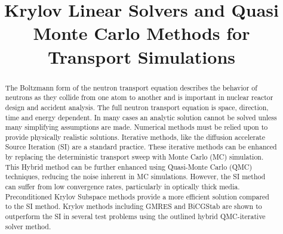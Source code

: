 \documentclass{nseJournal}
\begin{document}
\title{Krylov Linear Solvers and Quasi Monte Carlo
Methods for Transport Simulations}


{}


\titlePage

\begin{abstract}
The Boltzmann form of the neutron transport equation describes the behavior of neutrons as they collide from one atom to another and is important in nuclear reactor design and accident analysis. The full neutron transport equation is space, direction, time and energy dependent. In many cases an analytic solution cannot be solved unless many simplifying assumptions are made. Numerical methods must be relied upon to provide physically realistic solutions. Iterative methods, like the diffusion accelerate Source Iteration (SI) are a standard practice. These iterative methods can be enhanced by replacing the deterministic transport sweep with Monte Carlo (MC) simulation. This Hybrid method can be further enhanced using Quasi-Monte Carlo (QMC) techniques, reducing the noise inherent in MC simulations. However, the SI method can suffer from low convergence rates, particularly in optically thick media. Preconditioned Krylov Subspace methods provide a more efficient solution compared to the SI method. Krylov methods including GMRES and BiCGStab are shown to outperform the SI in several test problems using the outlined hybrid QMC-iterative solver method.  
\end{abstract}
\end{document}
